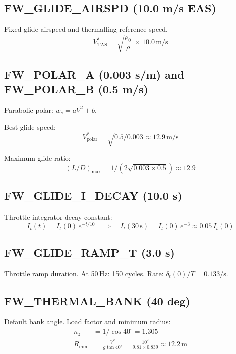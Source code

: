 \documentclass[12pt,a4paper]{report}
\begin{document}
\subsection{FW\_GLIDE\_AIRSPD (10.0 m/s EAS)}

Fixed glide airspeed and thermalling reference speed.
\begin{equation}
  V_{\text{TAS}}^* = \sqrt{\frac{\rho_0}{\rho}}\,\times\,10.0\,\text{m/s}
\end{equation}

\subsection{FW\_POLAR\_A (0.003 s/m) and FW\_POLAR\_B (0.5 m/s)}

Parabolic polar: $w_s = aV^2 + b$.

Best-glide speed:
\begin{equation}
  V^*_{\text{polar}} = \sqrt{0.5/0.003} \approx 12.9\,\text{m/s}
\end{equation}

Maximum glide ratio:
\begin{equation}
  (L/D)_{\max} = 1/(2\sqrt{0.003\times 0.5}) \approx 12.9
\end{equation}

\subsection{FW\_GLIDE\_I\_DECAY (10.0 s)}

Throttle integrator decay constant:
\begin{equation}
  I_t(t) = I_t(0)\,e^{-t/10} \quad\Rightarrow\quad
  I_t(30\,\text{s}) = I_t(0)\,e^{-3} \approx 0.05\,I_t(0)
\end{equation}

\subsection{FW\_GLIDE\_RAMP\_T (3.0 s)}

Throttle ramp duration. At 50\,Hz: 150 cycles. Rate: $\delta_t(0)/T = 0.133/\text{s}$.

\subsection{FW\_THERMAL\_BANK (40 deg)}

Default bank angle. Load factor and minimum radius:
\begin{align}
  n_z &= 1/\cos 40^\circ = 1.305 \\
  R_{\min} &= \frac{V^2}{g\tan 40^\circ}
            = \frac{10^2}{9.81 \times 0.839} \approx 12.2\,\text{m}
\end{align}
\end{document}
